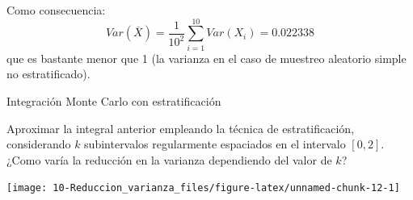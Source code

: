 \documentclass[]{book}
\newenvironment{Shaded}{\begin{snugshade}}{\end{snugshade}}
\newcommand{\KeywordTok}[1]{\textcolor[rgb]{0.13,0.29,0.53}{\textbf{#1}}}
\newcommand{\DataTypeTok}[1]{\textcolor[rgb]{0.13,0.29,0.53}{#1}}
\newcommand{\DecValTok}[1]{\textcolor[rgb]{0.00,0.00,0.81}{#1}}
\newcommand{\StringTok}[1]{\textcolor[rgb]{0.31,0.60,0.02}{#1}}
\newcommand{\CommentTok}[1]{\textcolor[rgb]{0.56,0.35,0.01}{\textit{#1}}}
\newcommand{\ControlFlowTok}[1]{\textcolor[rgb]{0.13,0.29,0.53}{\textbf{#1}}}
\newcommand{\OperatorTok}[1]{\textcolor[rgb]{0.81,0.36,0.00}{\textbf{#1}}}
\newcommand{\NormalTok}[1]{#1}
\theoremstyle{definition}
\theoremstyle{definition}
\theoremstyle{definition}
\theoremstyle{remark}
\let\BeginKnitrBlock\begin \let\EndKnitrBlock\end
\begin{document}
Como consecuencia:
\[Var\left(  \overline{X}\right)  =\frac{1}{10^{2}}\sum_{i=1}^{10}
Var\left( X_{i} \right)  = 0.022338\] que es bastante menor que 1 (la
varianza en el caso de muestreo aleatorio simple no estratificado).

\BeginKnitrBlock{exercise}
\protect\hypertarget{exr:unnamed-chunk-11}{}{\label{exr:unnamed-chunk-11}
}Integración Monte Carlo con estratificación
\EndKnitrBlock{exercise}

Aproximar la integral anterior empleando la técnica de estratificación,
considerando \(k\) subintervalos regularmente espaciados en el intervalo
\(\left[ 0, 2 \right]\). ¿Como varía la reducción en la varianza
dependiendo del valor de \(k\)?

\begin{Shaded}
\end{Shaded}

\begin{center}\texttt{[image: 10-Reduccion\_varianza\_files/figure-latex/unnamed-chunk-12-1]} \end{center}
\end{document}
